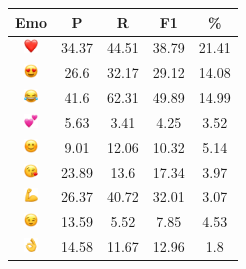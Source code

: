 \documentclass{article}
\begin{document}
\begin{table}
\centering
\begin{tabular}{|c|ccc|c|} \hline
\textbf{Emo} & \textbf{P} & \textbf{R} & \textbf{F1} & \textbf{\%} \\ \hline
\includegraphics[height=0.37cm,width=0.37cm]{img/red_heart.png} & 34.37 & 44.51 & 38.79 & 21.41\\ 
\includegraphics[height=0.37cm,width=0.37cm]{img/smiling_face_with_hearteyes.png} & 26.6 & 32.17 & 29.12 & 14.08\\ 
\includegraphics[height=0.37cm,width=0.37cm]{img/face_with_tears_of_joy.png} & 41.6 & 62.31 & 49.89 & 14.99\\ 
\includegraphics[height=0.37cm,width=0.37cm]{img/two_hearts.png} & 5.63 & 3.41 & 4.25 & 3.52\\ 
\includegraphics[height=0.37cm,width=0.37cm]{img/smiling_face_with_smiling_eyes.png} & 9.01 & 12.06 & 10.32 & 5.14\\ 
\includegraphics[height=0.37cm,width=0.37cm]{img/face_blowing_a_kiss.png} & 23.89 & 13.6 & 17.34 & 3.97\\ 
\includegraphics[height=0.37cm,width=0.37cm]{img/flexed_biceps.png} & 26.37 & 40.72 & 32.01 & 3.07\\ 
\includegraphics[height=0.37cm,width=0.37cm]{img/winking_face.png} & 13.59 & 5.52 & 7.85 & 4.53\\ 
\includegraphics[height=0.37cm,width=0.37cm]{img/OK_hand.png} & 14.58 & 11.67 & 12.96 & 1.8\\ 

\end{tabular}
\end{table}
\end{document}

